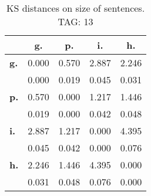 \begin{table}[h!]
\begin{center}
\begin{tabular}{| l || c | c | c | c |}\hline
 & {\bf g.} & {\bf p.} & {\bf i.} & {\bf h.} \\\hline\hline
{\bf g.} & 0.000 & 0.570 & 2.887 & 2.246 \\
{\bf } & 0.000 & 0.019 & 0.045 & 0.031 \\\hline
{\bf p.} & 0.570 & 0.000 & 1.217 & 1.446 \\
{\bf } & 0.019 & 0.000 & 0.042 & 0.048 \\\hline
{\bf i.} & 2.887 & 1.217 & 0.000 & 4.395 \\
{\bf } & 0.045 & 0.042 & 0.000 & 0.076 \\\hline
{\bf h.} & 2.246 & 1.446 & 4.395 & 0.000 \\
{\bf } & 0.031 & 0.048 & 0.076 & 0.000 \\\hline
\end{tabular}
\caption{KS distances on size of sentences. TAG: 13}
\end{center}
\end{table}